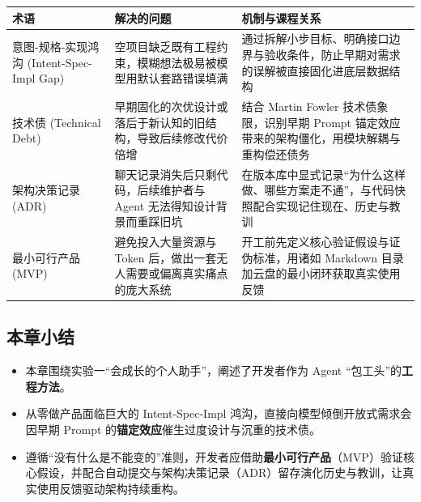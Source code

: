 \documentclass[UTF8,a4paper,11pt,fontset=fandol]{ctexart}
\begin{document}
\begin{center}\small\begin{tabularx}{\linewidth}{YYY}

\toprule

术语 & 解决的问题 & 机制与课程关系\\\midrule

意图-规格-实现鸿沟 (Intent-Spec-Impl Gap) & 空项目缺乏既有工程约束，模糊想法极易被模型用默认套路错误填满 & 通过拆解小步目标、明确接口边界与验收条件，防止早期对需求的误解被直接固化进底层数据结构\\[3pt]

技术债 (Technical Debt) & 早期固化的次优设计或落后于新认知的旧结构，导致后续修改代价倍增 & 结合 Martin Fowler 技术债象限，识别早期 Prompt 锚定效应带来的架构僵化，用模块解耦与重构偿还债务\\[3pt]

架构决策记录 (ADR) & 聊天记录消失后只剩代码，后续维护者与 Agent 无法得知设计背景而重踩旧坑 & 在版本库中显式记录“为什么这样做、哪些方案走不通”，与代码快照配合实现记住现在、历史与教训\\[3pt]

最小可行产品 (MVP) & 避免投入大量资源与 Token 后，做出一套无人需要或偏离真实痛点的庞大系统 & 开工前先定义核心验证假设与证伪标准，用诸如 Markdown 目录加云盘的最小闭环获取真实使用反馈\\[3pt]

\bottomrule\end{tabularx}\end{center}

\subsection{本章小结}

\begin{itemize}
\item 本章围绕实验一“会成长的个人助手”，阐述了开发者作为 Agent “包工头”的\textbf{工程方法}。

\item 从零做产品面临巨大的 Intent-Spec-Impl 鸿沟，直接向模型倾倒开放式需求会因早期 Prompt 的\textbf{锚定效应}催生过度设计与沉重的技术债。

\item 遵循“没有什么是不能变的”准则，开发者应借助\textbf{最小可行产品}（MVP）验证核心假设，并配合自动提交与架构决策记录（ADR）留存演化历史与教训，让真实使用反馈驱动架构持续重构。
\end{itemize}
\end{document}
